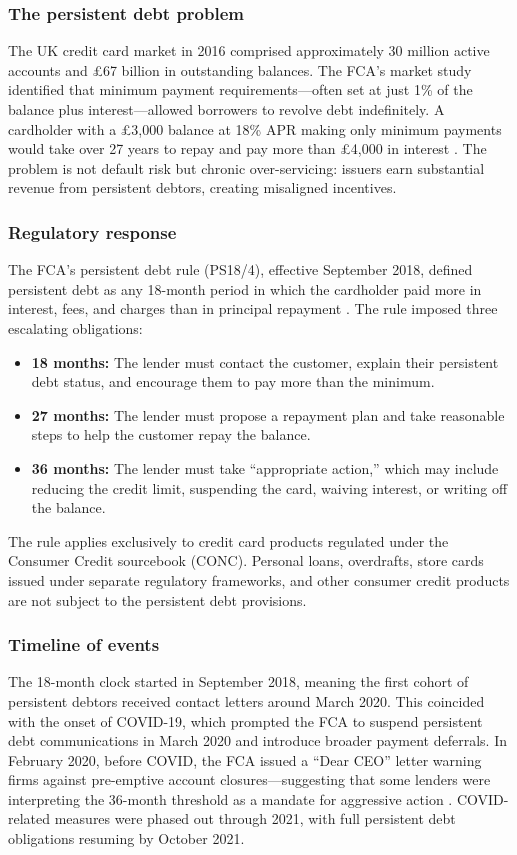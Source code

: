 \documentclass[12pt]{article}
\begin{document}
\subsubsection*{The persistent debt problem} The UK credit card market in 2016 comprised approximately 30 million active accounts and \pounds67 billion in outstanding balances. The FCA's market study identified that minimum payment requirements---often set at just 1\% of the balance plus interest---allowed borrowers to revolve debt indefinitely. A cardholder with a \pounds3,000 balance at 18\% APR making only minimum payments would take over 27 years to repay and pay more than \pounds4,000 in interest \citep{fca2016ccms}. The problem is not default risk but chronic over-servicing: issuers earn substantial revenue from persistent debtors, creating misaligned incentives.

\subsubsection*{Regulatory response} The FCA's persistent debt rule (PS18/4), effective September 2018, defined persistent debt as any 18-month period in which the cardholder paid more in interest, fees, and charges than in principal repayment \citep{fca2018ps184}. The rule imposed three escalating obligations:

\begin{itemize}
\item \textbf{18 months:} The lender must contact the customer, explain their persistent debt status, and encourage them to pay more than the minimum.
\item \textbf{27 months:} The lender must propose a repayment plan and take reasonable steps to help the customer repay the balance.
\item \textbf{36 months:} The lender must take ``appropriate action,'' which may include reducing the credit limit, suspending the card, waiving interest, or writing off the balance.
\end{itemize}

The rule applies exclusively to credit card products regulated under the Consumer Credit sourcebook (CONC). Personal loans, overdrafts, store cards issued under separate regulatory frameworks, and other consumer credit products are not subject to the persistent debt provisions.

\subsubsection*{Timeline of events} The 18-month clock started in September 2018, meaning the first cohort of persistent debtors received contact letters around March 2020. This coincided with the onset of COVID-19, which prompted the FCA to suspend persistent debt communications in March 2020 and introduce broader payment deferrals. In February 2020, before COVID, the FCA issued a ``Dear CEO'' letter warning firms against pre-emptive account closures---suggesting that some lenders were interpreting the 36-month threshold as a mandate for aggressive action \citep{fca2020dear}. COVID-related measures were phased out through 2021, with full persistent debt obligations resuming by October 2021.
\end{document}
